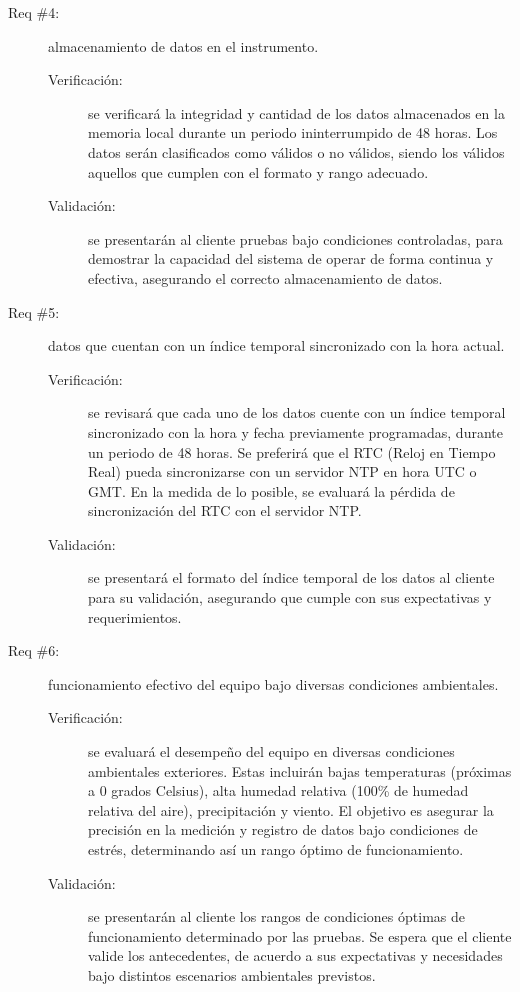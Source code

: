 \begin{description}
	\item [Req \#4:] almacenamiento de datos en el instrumento.
	
	\begin{description}
		\item [Verificación:] se verificará la integridad y cantidad de los datos almacenados en la memoria local durante un periodo ininterrumpido de 48 horas. Los datos serán clasificados como válidos o no válidos, siendo los válidos aquellos que cumplen con el formato y rango adecuado.
		\item [Validación:] se presentarán al cliente pruebas bajo condiciones controladas, para demostrar la capacidad del sistema de operar de forma continua y efectiva, asegurando el correcto almacenamiento de datos.
	\end{description}
	
	\item [Req \#5:] datos que cuentan con un índice temporal sincronizado con la hora actual.
	\begin{description}
		\item [Verificación:] se revisará que cada uno de los datos cuente con un índice temporal sincronizado con la hora y fecha previamente programadas, durante un periodo de 48 horas. Se preferirá que el RTC (Reloj en Tiempo Real) pueda sincronizarse con un servidor NTP en hora UTC o GMT. En la medida de lo posible, se evaluará la pérdida de sincronización del RTC con el servidor NTP.
		\item [Validación:] se presentará el formato del índice temporal de los datos al cliente para su validación, asegurando que cumple con sus expectativas y requerimientos.
	\end{description}
	
	\item [Req \#6:] funcionamiento efectivo del equipo bajo diversas condiciones ambientales. 
	\begin{description}
		\item [Verificación:] se evaluará el desempeño del equipo en diversas condiciones ambientales exteriores. Estas incluirán bajas temperaturas (próximas a 0 grados Celsius), alta humedad relativa (100\% de humedad relativa del aire), precipitación y viento. El objetivo es asegurar la precisión en la medición y registro de datos bajo condiciones de estrés, determinando así un rango óptimo de funcionamiento.
		\item [Validación:] se presentarán al cliente los rangos de condiciones óptimas de funcionamiento determinado por las pruebas. Se espera que el cliente valide los antecedentes, de acuerdo a sus expectativas y necesidades bajo distintos escenarios ambientales previstos.
	\end{description}
	

\end{description}

